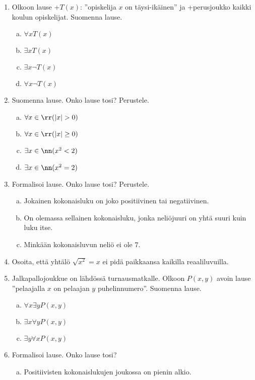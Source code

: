\begin{tehtavasivu}

\begin{enumerate}%
\item Olkoon lause
+$T(x)$: ''opiskelija $x$ on täysi-ikäinen'' ja
+perusjoukko kaikki koulun opiskelijat. Suomenna lause.
\begin{enumerate}[a)]
\item $\forall x T(x)$
\item $\exists x T(x)$
\item $\exists x \lnot T(x)$
\item $\forall x \lnot T(x)$
\end{enumerate}%
\item Suomenna lause. Onko lause tosi? Perustele.
\begin{enumerate}[a)]
\item $\forall x\in\rr (|x| > 0)$
\item $\forall x\in\rr (|x| \ge 0)$
\item $\exists x\in\nn (x^2 < 2)$
\item $\exists x\in\nn (x^2 = 2)$
\end{enumerate}%
\item
Formalisoi lause. Onko lause tosi? Perustele.
\begin{enumerate}[a)]
\item Jokainen kokonaisluku on joko positiivinen tai
negatiivinen.
\item On olemassa sellainen kokonaisluku, jonka neliöjuuri on
yhtä suuri kuin luku itse.
\item Minkään kokonaisluvun neliö ei ole $7$.
\end{enumerate}%
\item Osoita, että yhtälö $\sqrt{x^2} = x$ ei pidä paikkaansa
kaikilla reaaliluvuilla.%
\item Jalkapallojoukkue on lähdössä turnausmatkalle. Olkoon
$P(x, y)$ avoin lause ''pelaajalla $x$ on pelaajan $y$
puhelinnumero''. Suomenna lause.
\begin{enumerate}[a)]
\item $\forall x \exists y P(x, y)$
\item $\exists x \forall y P(x, y)$
\item $\exists y \forall x P(x, y)$
\end{enumerate}%
\item
Formalisoi lause. Onko lause tosi?
\begin{enumerate}[a)]
\item Positiivisten kokonaislukujen joukossa on pienin alkio.

\end{enumerate}
\end{enumerate}
\end{tehtavasivu}
